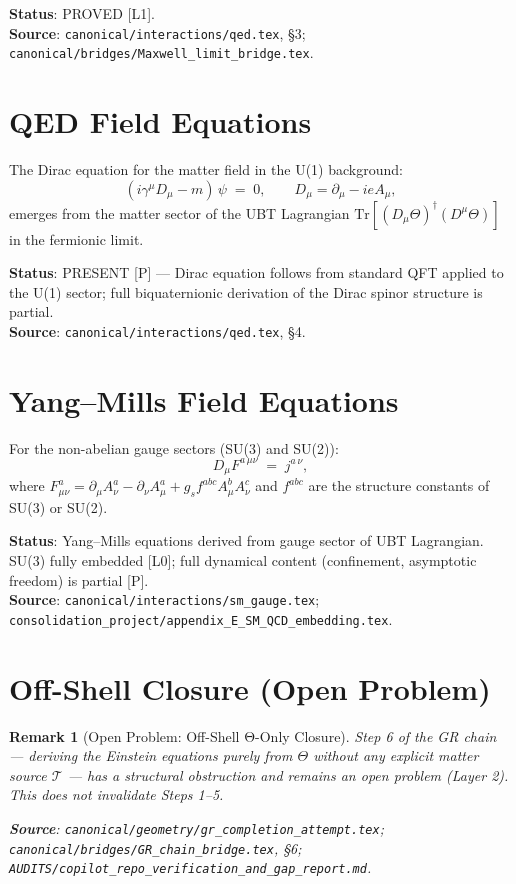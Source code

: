 \documentclass[11pt,a4paper]{article}
\newtheorem{remark}{Remark}
\begin{document}
\noindent\textbf{Status}: PROVED [L1].\\
\noindent\textbf{Source}: \texttt{canonical/interactions/qed.tex}, \S3;
\texttt{canonical/bridges/Maxwell\_limit\_bridge.tex}.

\section{QED Field Equations}

The Dirac equation for the matter field in the U(1) background:
\begin{equation}\label{eq:Dirac}
  (i\gamma^\mu D_\mu - m)\,\psi \;=\; 0,
  \qquad
  D_\mu = \partial_\mu - ieA_\mu,
\end{equation}
emerges from the matter sector of the UBT Lagrangian
$\mathrm{Tr}[(D_\mu\Theta)^\dagger(D^\mu\Theta)]$
in the fermionic limit.

\noindent\textbf{Status}: PRESENT [P] — Dirac equation follows from standard
QFT applied to the U(1) sector; full biquaternionic derivation of the
Dirac spinor structure is partial.\\
\noindent\textbf{Source}: \texttt{canonical/interactions/qed.tex}, \S4.

\section{Yang--Mills Field Equations}

For the non-abelian gauge sectors (SU(3) and SU(2)):
\begin{equation}\label{eq:YM}
  D_\mu F^{a\,\mu\nu} \;=\; j^{a\,\nu},
\end{equation}
where $F^a_{\mu\nu} = \partial_\mu A^a_\nu - \partial_\nu A^a_\mu
+ g_s f^{abc} A^b_\mu A^c_\nu$ and $f^{abc}$ are the structure constants
of SU(3) or SU(2).

\noindent\textbf{Status}: Yang--Mills equations derived from gauge sector
of UBT Lagrangian. SU(3) fully embedded [L0]; full dynamical content
(confinement, asymptotic freedom) is partial [P].\\
\noindent\textbf{Source}: \texttt{canonical/interactions/sm\_gauge.tex};
\texttt{consolidation\_project/appendix\_E\_SM\_QCD\_embedding.tex}.

\section{Off-Shell Closure (Open Problem)}

\begin{remark}[Open Problem: Off-Shell Θ-Only Closure]
Step 6 of the GR chain — deriving the Einstein equations purely from $\Theta$
without any explicit matter source $\mathcal{T}$ — has a structural obstruction
and remains an open problem (Layer 2). This does \emph{not} invalidate Steps 1--5.

\noindent\textbf{Source}: \texttt{canonical/geometry/gr\_completion\_attempt.tex};
\texttt{canonical/bridges/GR\_chain\_bridge.tex}, \S6;
\texttt{AUDITS/copilot\_repo\_verification\_and\_gap\_report.md}.
\end{remark}
\end{document}
